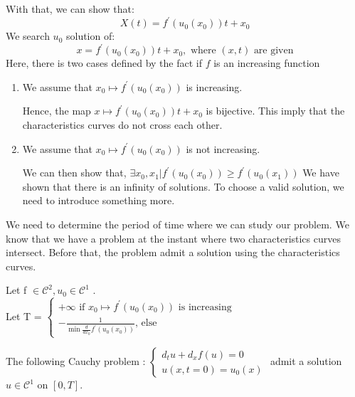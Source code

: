         With that, we can show that:
        \begin{equation}
            X\left(t\right) = f^\prime\left(u_0\left(x_0\right)\right)t + x_0
        \end{equation}
        We search $u_0$ solution of:
        \begin{equation}
            x = f^\prime\left(u_0\left(x_0\right)\right)t + x_0, \text{ where } \left(x,t\right) \text{ are given}
        \end{equation}
        Here, there is two cases defined by the fact if $f$ is an increasing function
        \begin{enumerate}
            \item We assume that $x_0 \mapsto f^\prime\left(u_0\left(x_0\right)\right)$ is increasing.
            
            Hence, the map $x \mapsto f^\prime\left(u_0\left(x_0\right)\right)t + x_0$ is bijective. This imply that the characteristics curves do not cross each other.
            
            \item  We assume that $x_0 \mapsto f^\prime\left(u_0\left(x_0\right)\right)$ is not increasing.
            
            We can then show that, $\exists x_0, x_1 | f^\prime\left(u_0\left(x_0\right)\right) \geq f^\prime\left(u_0\left(x_1\right)\right)$
            We have shown that there is an infinity of solutions. To choose a valid solution, we need to introduce something more.
        \end{enumerate}
        We need to determine the period of time where we can study our problem. We know that we have a problem at the instant where two characteristics curves intersect. Before that, the problem admit a solution using the characteristics curves.
        
        \begin{theorem}
            Let f $\in \mathscr{C}^2, u_0 \in \mathscr{C}^1$ .\\
            Let T =  
            $
            \begin{cases}
                +\infty\text{ if $x_0 \mapsto f^\prime\left(u_0\left(x_0\right)\right)$ is increasing}\\
                - \frac{1}{\min \frac{d}{dx_0}f^\prime\left(u_0\left(x_0\right)\right)}\text{, else}
            \end{cases}
            $
           
            The following Cauchy problem :
            $
            \begin{cases}
                d_t u + d_x f\left(u\right) = 0 \\
                u\left(x,t=0\right) = u_0\left(x\right)
                \end{cases}
            $
            admit a solution $u \in \mathscr{C}^1$ on $[0,T ]$.
        \end{theorem}
        
